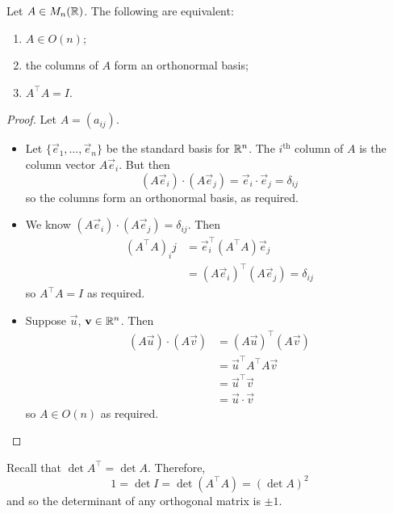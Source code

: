 \documentclass{../template/note}
\begin{document}
    \begin{lemma}[Matrices in \(O(n)\)]
        Let \(A \in M_n(\mathbb R)\). The following are equivalent:
        \begin{enumerate}[label=\protect\circled{\arabic*}]
            \item \(A \in O(n)\);
            \item the columns of \(A\) form an orthonormal basis;
            \item \(A^\intercal A = I\).
        \end{enumerate}
    \end{lemma}
    
    \begin{proof}
        Let \(A = (a_{ij})\).
        \begin{itemize}[leftmargin=60px]
            \item[(\(1 \implies 2\))] Let \(\{\vec e_1, \dots, \vec e_n\}\) be the standard basis for \(\mathbb R^n\). The \(i^\text{th}\) column of \(A\) is the column vector \(A\vec e_i\). But then
            \[
                (A \vec e_i) \cdot (A \vec e_j) = \vec e_i \cdot \vec e_j = \delta_{ij}
            \]
            so the columns form an orthonormal basis, as required.
            \item[(\(2 \implies 3\))] We know \((A\vec e_i) \cdot (A \vec e_j) = \delta_{ij}\). Then
            \begin{align*}
                (A^\intercal A)_ij &= \vec e_i^\intercal (A^\intercal A) \vec e_j \\
                &= (A \vec e_i)^\intercal (A \vec e_j) = \delta_{ij}
            \end{align*}
            so \(A^\intercal A = I\) as required. \\
            \item[(\(3 \implies 1\))] Suppose \(\vec u\), \(\vec v \in \RR^n\). Then
            \begin{align*}
                (A \vec u) \cdot (A \vec v) &= (A \vec u)^\intercal (A \vec v) \\
                &= \vec u^\intercal A^\intercal A \vec v \\
                &= \vec u^\intercal \vec v \\
                &= \vec u \cdot \vec v
            \end{align*}
            so \(A \in O(n)\) as required.            
        \end{itemize}
    \end{proof}
    Recall that \(\det A^\intercal = \det A\). Therefore,
    \[
        1 = \det I = \det (A^\intercal A) = (\det A)^2
    \]
    and so the determinant of any orthogonal matrix is \(\pm 1\).
\end{document}
